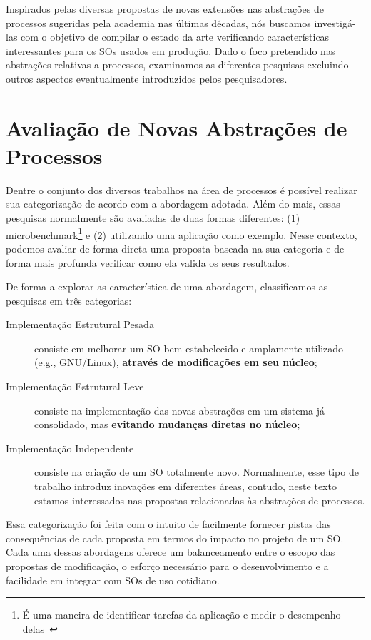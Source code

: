 Inspirados pelas diversas propostas de novas extensões nas abstrações de
processos sugeridas pela academia nas últimas décadas, nós buscamos
investigá-las com o objetivo de compilar o estado da arte verificando
características interessantes para os SOs usados em produção. Dado o foco
pretendido nas abstrações relativas a processos, examinamos as diferentes
pesquisas excluindo outros aspectos eventualmente introduzidos pelos
pesquisadores.

\section{Avaliação de Novas Abstrações de Processos}

Dentre o conjunto dos diversos trabalhos na área de processos é possível
realizar sua categorização de acordo com a abordagem adotada. Além do
mais, essas pesquisas normalmente são avaliadas de duas formas diferentes: (1)
microbenchmark\footnote{É uma maneira de identificar tarefas da aplicação e
medir o desempenho delas~\citep{micro}} e (2) utilizando uma aplicação como
exemplo. Nesse contexto, podemos avaliar de forma direta uma proposta baseada
na sua categoria e de forma mais profunda verificar como ela valida os seus resultados.

De forma a explorar as característica de uma abordagem,
classificamos as pesquisas em três categorias:

\begin{description}
\item [Implementação Estrutural Pesada]

consiste em melhorar um SO bem estabelecido e amplamente utilizado (e.g.,
GNU/Linux), \textbf{através de modificações em seu núcleo};

\item [Implementação Estrutural Leve]

consiste na implementação das novas abstrações em um sistema já consolidado,
mas \textbf{evitando mudanças diretas no núcleo};

\item [Implementação Independente]

consiste na criação de um SO totalmente novo. Normalmente, esse tipo de
trabalho introduz inovações em diferentes áreas, contudo, neste texto estamos
interessados nas propostas relacionadas às abstrações de processos.

\end{description}

Essa categorização foi feita com o intuito de facilmente fornecer pistas das
consequências de cada proposta em termos do impacto no projeto de um SO. Cada
uma dessas abordagens oferece um balanceamento entre o escopo das propostas de
modificação, o esforço necessário para o desenvolvimento e a facilidade em
integrar com SOs de uso cotidiano.

